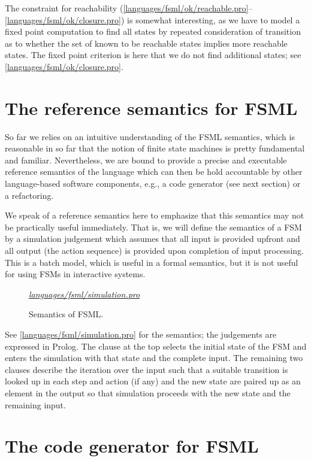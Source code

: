 \documentclass[preprint,authoryear,12pt]{noelsarticle}
\newcommand{\codefigure}[3]{
\begin{figure}[t!]
\begin{boxedminipage}{\hsize}
\mbox{}\hfill{}{\small\textit{\href{http://github.com/slebok/slepro/tree/master/#2}{#2}}}

\end{boxedminipage}
\caption{#1.}
\label{#2}
\medskip
\end{figure}}
\begin{document}
The constraint for reachability
(\autoref{languages/fsml/ok/reachable.pro}--\autoref{languages/fsml/ok/closure.pro})
is somewhat interesting, as we have to model a fixed point computation
to find all states by repeated consideration of transition as to
whether the set of known to be reachable states implies more reachable
states. The fixed point criterion is here that we do not find
additional states; see \autoref{languages/fsml/ok/closure.pro}.


\section{The reference semantics for FSML}
\label{S:semantics}

So far we relies on an intuitive understanding of the FSML semantics,
which is reasonable in so far that the notion of finite state machines
is pretty fundamental and familiar. Nevertheless, we are bound to
provide a precise and executable reference semantics of the language
which can then be hold accountable by other language-based software
components, e.g., a code generator (see next section) or a
refactoring. 

We speak of a reference semantics here to emphasize that this
semantics may not be practically useful immediately. That is, we
will define the semantics of a FSM by a simulation judgement which
assumes that all input is provided upfront and all output (the action
sequence) is provided upon completion of input processing. This is a
batch model, which is useful in a formal semantics, but it is not
useful for using FSMs in interactive systems.

\codefigure{%
Semantics of FSML}{%
languages/fsml/simulation.pro}{%
prolog}

See \autoref{languages/fsml/simulation.pro} for the semantics; the
judgements are expressed in Prolog. The clause at the top selects the
initial state of the FSM and enters the simulation with that state and
the complete input. The remaining two clauses describe the iteration
over the input such that a suitable transition is looked up in each
step and action (if any) and the new state are paired up as an element in
the output so that simulation proceeds with the new state and the
remaining input.


\section{The code generator for FSML}
\label{S:generator}
\end{document}
